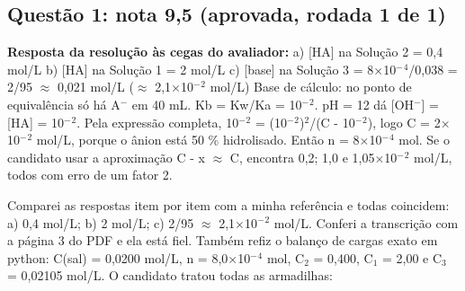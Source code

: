 \documentclass{article}%
\begin{document}
\subsection*{Questão 1: nota 9,5 (aprovada, rodada 1 de 1)}%
\textbf{Resposta da resolução às cegas do avaliador:} a) {[}HA{]} na Solução 2 = 0,4 mol/L\newline%
b) {[}HA{]} na Solução 1 = 2 mol/L\newline%
c) {[}base{]} na Solução 3 = 8$\times$10$^{-}$$^{4}$/0,038 = 2/95 $\approx$ 0,021 mol/L ($\approx$ 2,1$\times$10$^{-}$$^2$ mol/L)\newline%
\newline%
Base de cálculo: no ponto de equivalência só há A$^{-}$ em 40 mL. Kb = Kw/Ka = 10$^{-}$$^2$. pH = 12 dá {[}OH$^{-}${]} = {[}HA{]} = 10$^{-}$$^2$. Pela expressão completa, 10$^{-}$$^2$ = (10$^{-}$$^2$)$^2$/(C - 10$^{-}$$^2$), logo C = 2$\times$10$^{-}$$^2$ mol/L, porque o ânion está 50 \% hidrolisado. Então n = 8$\times$10$^{-}$$^{4}$ mol. Se o candidato usar a aproximação C - x $\approx$ C, encontra 0,2; 1,0 e 1,05$\times$10$^{-}$$^2$ mol/L, todos com erro de um fator 2.\par %
Comparei as respostas item por item com a minha referência e todas coincidem: a) 0,4 mol/L; b) 2 mol/L; c) 2/95 $\approx$ 2,1$\times$10$^{-}$$^2$ mol/L. Conferi a transcrição com a página 3 do PDF e ela está fiel. Também refiz o balanço de cargas exato em python: C(sal) = 0,0200 mol/L, n = 8,0$\times$10$^{-}$$^{4}$ mol, C$_{2}$ = 0,400, C$_{1}$ = 2,00 e C$_{3}$ = 0,02105 mol/L.\newline%
\newline%
O candidato tratou todas as armadilhas:\newline%
\end{document}
